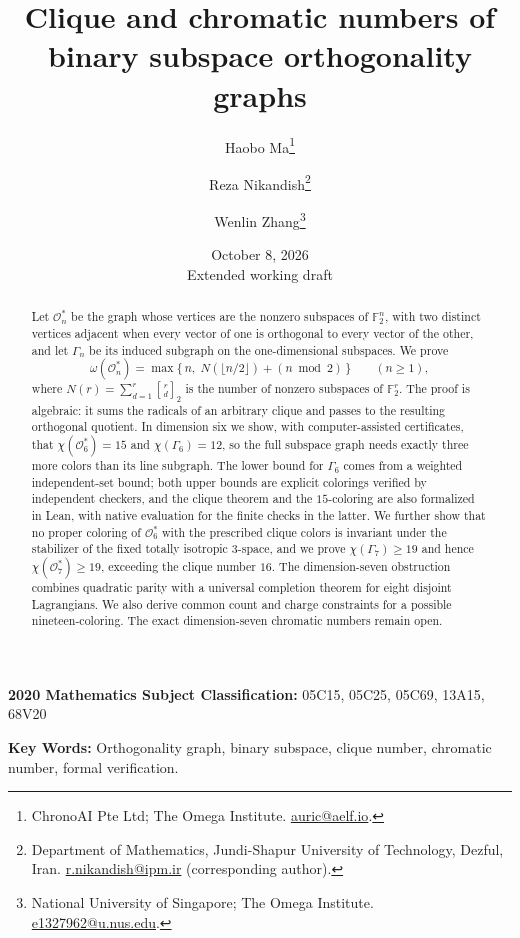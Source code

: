 \documentclass[11pt]{article}
\title{Clique and chromatic numbers of binary subspace orthogonality graphs}
\author{Haobo Ma\thanks{ChronoAI Pte Ltd; The Omega Institute.
  \href{mailto:auric@aelf.io}{auric@aelf.io}.}
  \and
  Reza Nikandish\thanks{Department of Mathematics,
  Jundi-Shapur University of Technology, Dezful, Iran.
  \href{mailto:r.nikandish@ipm.ir}{r.nikandish@ipm.ir}
  (corresponding author).}
  \and
  Wenlin Zhang\thanks{National University of Singapore; The Omega Institute.
  \href{mailto:e1327962@u.nus.edu}{e1327962@u.nus.edu}.}}
\date{October 8, 2026\\[0.5ex]\small Extended working draft}
\theoremstyle{remark}
\theoremstyle{definition}
\newcommand{\F}{\mathbb F_2}
\newcommand{\OG}{\mathcal O}
\begin{document}
\maketitle

\begin{abstract}
Let $\OG_n^*$ be the graph whose vertices are the nonzero subspaces of
$\F^n$, with two distinct vertices adjacent when every vector of one is
orthogonal to every vector of the other, and let $\Gamma_n$ be its
induced subgraph on the one-dimensional subspaces. We prove
\[
  \omega(\OG_n^*)=\max\bigl\{\,n,\; N(\lfloor n/2\rfloor)+(n \bmod 2)\,\bigr\}
  \qquad (n\ge 1),
\]
where $N(r)=\sum_{d=1}^{r}\genfrac{[}{]}{0pt}{}{r}{d}_2$ is the number of nonzero
subspaces of $\F^r$. The proof is algebraic: it sums the radicals of an
arbitrary clique and passes to the resulting orthogonal quotient. In
dimension six we show, with computer-assisted certificates, that
$\chi(\OG_6^*)=15$ and $\chi(\Gamma_6)=12$, so the full subspace graph
needs exactly three more colors than its line subgraph. The lower bound
for $\Gamma_6$ comes from a weighted independent-set bound; both upper
bounds are explicit colorings verified by independent checkers, and the
clique theorem and the $15$-coloring are also formalized in Lean,
with native evaluation for the finite checks in the latter. We
further show that no proper coloring of $\OG_6^*$ with the prescribed
clique colors is invariant under the stabilizer of the fixed totally
isotropic $3$-space, and we prove $\chi(\Gamma_7)\geq19$ and hence
$\chi(\OG_7^*)\geq19$, exceeding the clique number $16$.
The dimension-seven obstruction combines quadratic parity with a
universal completion theorem for eight disjoint Lagrangians.
We also derive common count and charge constraints for a possible
nineteen-coloring. The exact dimension-seven chromatic numbers remain open.
\end{abstract}

\medskip
\noindent\textbf{2020 Mathematics Subject Classification:}
05C15, 05C25, 05C69, 13A15, 68V20

\medskip
\noindent\textbf{Key Words:}
Orthogonality graph, binary subspace, clique number,
chromatic number, formal verification.









\end{document}
